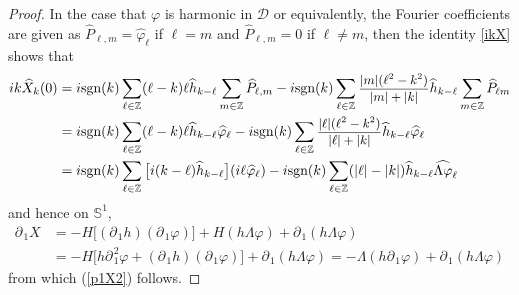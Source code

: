 \documentclass[11pt]{article}
\theoremstyle{plain}
\theoremstyle{definition}
\theoremstyle{definition}
\def\bbZ{{\mathbb Z}}
\def\D{{\mathcal D}}
\def\p{\text{\bf\emph{p}}}
\def\ft #1{{\widehat{#1}}}
\def\p{{\partial\hspace{1pt}}}
\def\smallexp#1{{\text{\small #1}}}
\def\dfrac#1#2{\smallexp{$\displaystyle{}\frac{#1}{#2}$}}
\begin{document}
\begin{proof}
In the case that $\varphi$ is harmonic in $\D$ or equivalently, the Fourier coefficients are given as $\ft{P}_{\ell,m} = \ft{\varphi}_\ell$ if $\ell = m$
and $\ft{P}_{\ell,m} = 0$ if $\ell \ne m$, then the identity \eqref{ikX} shows that
\begin{align*}
i k \ft{X}_k(0) &=i \text{\rm sgn}(k) \sum_{\ell\in\bbZ} (\ell-k)\ell \ft{h}_{k-\ell} \sum_{m\in\bbZ} \ft{P}_{\ell,m} - i\text{sgn}(k) \sum_{\ell\in \bbZ}
\dfrac{|m| (\ell^2 - k^2)}{|m|+|k|} \ft{h}_{k-\ell} \sum_{m\in\bbZ} \ft{P}_{\ell m} \\
&= i \text{\rm sgn}(k) \sum_{\ell\in\bbZ} (\ell-k)\ell \ft{h}_{k-\ell} \ft{\varphi}_\ell - i\text{sgn}(k) \sum_{\ell\in \bbZ} \dfrac{|\ell| (\ell^2 - k^2)}{|\ell|+|k|} \ft{h}_{k-\ell} \ft{\varphi}_{\ell} \\
&= i \text{\rm sgn}(k) \sum_{\ell\in\bbZ} \big[i (k-\ell)\ft{h}_{k-\ell}\big] (i \ell \ft{\varphi}_\ell) - i\text{sgn}(k) \sum_{\ell\in\bbZ} (|\ell| - |k|) \ft{h}_{k-\ell} \ft{\Lambda \varphi}_\ell
\end{align*}
and hence on $\mathbb{S}^1$,
\begin{align*}
\p_{\!1} X &= - H \big[(\p_{\!1} h) (\p_{\!1} \varphi)\big] + H (h \Lambda \varphi) + \p_{\!1} (h \Lambda \varphi) \\
&= - H \big[h \p_{\!1}^2 \varphi + (\p_{\!1} h)(\p_{\!1} \varphi)\big] + \p_{\!1} (h \Lambda \varphi) = - \Lambda (h \p_{\!1} \varphi) + \p_{\!1} (h \Lambda \varphi)
\end{align*}
from which (\ref{p1X2}) follows.
\end{proof}
\end{document}

